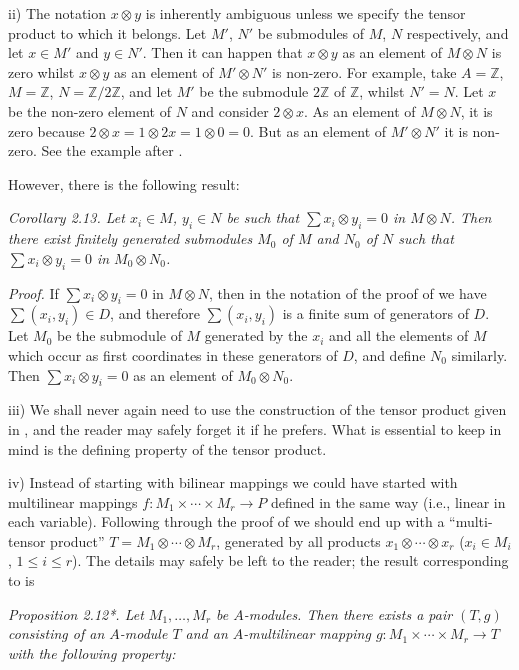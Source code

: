 ii) The notation $x\otimes y$ is inherently ambiguous unless we specify the tensor product to which it belongs. Let $M'$, $N'$ be submodules of $M$, $N$ respectively, and let $x\in M'$ and $y\in N'$. Then it can happen that $x\otimes y$ as an element of $M\otimes N$ is zero whilst $x\otimes y$ as an element of $M'\otimes N'$ is non-zero. For example, take $A=\mathbb Z$, $M=\mathbb Z$, $N=\mathbb Z/2\mathbb Z$, and let $M'$ be the submodule $2\mathbb Z$ of $\mathbb Z$, whilst $N'=N$. Let $x$ be the non-zero element of $N$ and consider $2\otimes x$. As an element of $M\otimes N$, it is zero because $2\otimes x=1\otimes2x=1\otimes0=0$. But as an element of $M'\otimes N'$ it is non-zero. See the example after .

However, there is the following result:

\noindent\textit{Corollary 2.13. Let $x_i\in M$, $y_i\in N$ be such that $\sum x_i\otimes y_i=0$ in $M\otimes N$. Then there exist finitely generated submodules $M_0$ of $M$ and $N_0$ of $N$ such that $\sum x_i\otimes y_i=0$ in $M_0\otimes N_0$.}

\noindent\textit{Proof.} If $\sum x_i\otimes y_i=0$ in $M\otimes N$, then in the notation of the proof of  we have $\sum(x_i,y_i)\in D$, and therefore $\sum(x_i,y_i)$ is a finite sum of generators of $D$. Let $M_0$ be the submodule of $M$ generated by the $x_i$ and all the elements of $M$ which occur as first coordinates in these generators of $D$, and define $N_0$ similarly. Then $\sum x_i\otimes y_i=0$ as an element of $M_0\otimes N_0$. \proofbox

iii) We shall never again need to use the construction of the tensor product given in , and the reader may safely forget it if he prefers. What is essential to keep in mind is the defining property of the tensor product.

iv) Instead of starting with bilinear mappings we could have started with multilinear mappings $f:M_1\times\cdots\times M_r\longrightarrow P$ defined in the same way (i.e., linear in each variable). Following through the proof of  we should end up with a ``multi-tensor product'' $T=M_1\otimes\cdots\otimes M_r$, generated by all products $x_1\otimes\cdots\otimes x_r$ ($x_i\in M_i$, $1\leq i\leq r$). The details may safely be left to the reader; the result corresponding to  is

\noindent\textit{Proposition 2.12*. Let $M_1,\ldots,M_r$ be $A$-modules. Then there exists a pair $(T,g)$ consisting of an $A$-module $T$ and an $A$-multilinear mapping $g:M_1\times\cdots\times M_r\longrightarrow T$ with the following property:}

